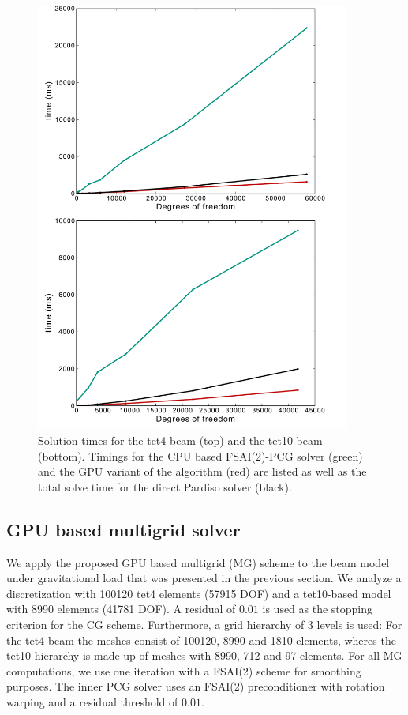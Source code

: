 \begin{figure}[htbp]
   \centering   
   \includegraphics[width=0.92\textwidth]{Figures/PerformanceComparisonFinalGPUPardiso.pdf}     
\caption{Solution times for the tet4 beam (top) and the tet10 beam (bottom). Timings for the CPU based FSAI(2)-PCG solver (green) and the GPU variant of the algorithm (red) are listed as well as the total solve time for the direct Pardiso solver (black). }
\label{PerformanceComparisonFinalGPUPardiso}
\end{figure}

\subsection{GPU based multigrid solver}
We apply the proposed GPU based multigrid (MG) scheme to the beam model under gravitational load that was presented in the previous section. We analyze a discretization with 100120 tet4 elements (57915 DOF) and a tet10-based model with 8990 elements (41781 DOF). A residual of $0.01$ is used as the stopping criterion for the CG scheme. Furthermore, a grid hierarchy of 3 levels is used: For the tet4 beam the meshes consist of 100120, 8990 and 1810 elements, wheres the tet10 hierarchy is made up of meshes with 8990, 712 and 97 elements. For all MG computations, we use one iteration with a FSAI(2) scheme for smoothing purposes. The inner PCG solver uses an FSAI(2) preconditioner with rotation warping and a residual threshold of $0.01$.

